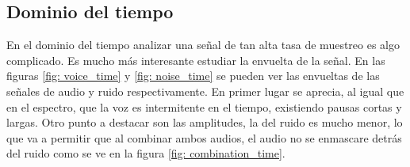 \subsection{Dominio del tiempo}
En el dominio del tiempo analizar una señal de tan alta tasa de muestreo es algo complicado. Es mucho más interesante estudiar la envuelta de la señal. En las figuras \ref{fig: voice_time} y \ref{fig: noise_time} se pueden ver las envueltas de las señales de audio y ruido respectivamente. En primer lugar se aprecia, al igual que en el espectro, que la voz es intermitente en el tiempo, existiendo pausas cortas y largas. Otro punto a destacar son las amplitudes, la del ruido es mucho menor, lo que va a permitir que al combinar ambos audios, el audio no se enmascare detrás del ruido como se ve en la figura \ref{fig: combination_time}.

